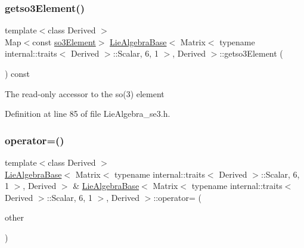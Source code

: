 \subsubsection{\texorpdfstring{getso3\+Element()}{getso3Element()}\hspace{0.1cm}{\footnotesize\ttfamily [2/2]}}
{\footnotesize\ttfamily template$<$class Derived $>$ \\
Map$<$const \hyperlink{class_lie_algebra_base_3_01_matrix_3_01typename_01internal_1_1traits_3_01_derived_01_4_1_1_scala449314c781550590437697c4dc21a6d4_aee714752364bcba43e97f130091fcc6e}{so3\+Element}$>$ \hyperlink{class_lie_algebra_base}{Lie\+Algebra\+Base}$<$ Matrix$<$ typename internal\+::traits$<$ Derived $>$\+::Scalar, 6, 1 $>$, Derived $>$\+::getso3\+Element (\begin{DoxyParamCaption}{ }\end{DoxyParamCaption}) const\hspace{0.3cm}{\ttfamily [inline]}}

The read-\/only accessor to the so(3) element 

Definition at line 85 of file Lie\+Algebra\+\_\+se3.\+h.

\hypertarget{class_lie_algebra_base_3_01_matrix_3_01typename_01internal_1_1traits_3_01_derived_01_4_1_1_scala449314c781550590437697c4dc21a6d4_aac0fa5e5bf38aae42e97aab8c6a13502}{}\label{class_lie_algebra_base_3_01_matrix_3_01typename_01internal_1_1traits_3_01_derived_01_4_1_1_scala449314c781550590437697c4dc21a6d4_aac0fa5e5bf38aae42e97aab8c6a13502} 
\subsubsection{\texorpdfstring{operator=()}{operator=()}\hspace{0.1cm}{\footnotesize\ttfamily [1/3]}}
{\footnotesize\ttfamily template$<$class Derived $>$ \\
\hyperlink{class_lie_algebra_base}{Lie\+Algebra\+Base}$<$ Matrix$<$ typename internal\+::traits$<$ Derived $>$\+::Scalar, 6, 1 $>$, Derived $>$ \& \hyperlink{class_lie_algebra_base}{Lie\+Algebra\+Base}$<$ Matrix$<$ typename internal\+::traits$<$ Derived $>$\+::Scalar, 6, 1 $>$, Derived $>$\+::operator= (\begin{DoxyParamCaption}\item[{const \hyperlink{class_lie_algebra_base}{Lie\+Algebra\+Base}$<$ Matrix$<$ typename internal\+::traits$<$ Derived $>$\+::Scalar, 6, 1 $>$, Derived $>$ \&}]{other }\end{DoxyParamCaption})\hspace{0.3cm}{\ttfamily [inline]}}

